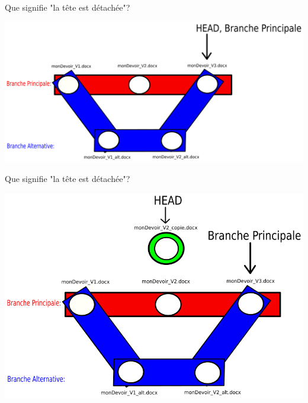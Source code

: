 \documentclass{beamer}
\begin{document}
\begin{frame}{Que signifie "la tête est détachée"?}
    \begin{center}
        \includegraphics[scale=0.35]{images/detachedHead/detachedHead0.png}
    \end{center}
\end{frame}

\begin{frame}{Que signifie "la tête est détachée"?}
    \begin{center}
        \includegraphics[scale=0.35]{images/detachedHead/detachedHead1.png}
    \end{center}
\end{frame}
\end{document}

